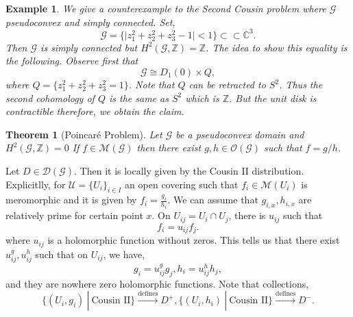 \documentclass{article}
\newtheorem{theorem}{Theorem} [section]
\newtheorem{example}{Example}[section]
\newcommand{\sU}[0]{\mathscr{U}}
\newcommand{\Z}[0]{\mathbb{Z}}
\newcommand{\C}[0]{\mathbb{C}}
\newcommand{\G}[0]{\mathcal{G}}
\newcommand{\sep}[0]{\:|\:}
\newcommand{\Ouv}[0]{\mathcal{O}}
\newcommand{\compembed}[0]{\subset\subset}
\begin{document}
\begin{example}
  We give a counterexample to the Second Cousin problem where $\G$ pseudoconvex and simply connected. Set,
  \begin{equation*}
    \G = \{\vert z_1^2+z_2^2+z_3^2-1\vert<1\}\compembed\C^3.
  \end{equation*}
  Then $\G$ is simply connected but $H^2(\G,\Z)=\Z$. The idea to show this equality is the following. Observe first that 
  \begin{equation*}
    \G\cong D_1(0)\times Q,
  \end{equation*}
  where $Q = \{z_1^2+z_2^2+z_3^2=1\}$. Note that $Q$ can be retracted to $S^2$. Thus the second cohomology of $Q$ is the same as $S^2$ which is $\Z$. But the unit disk is contractible therefore, we obtain the claim.
\end{example}
\begin{theorem}[Poincaré Problem]
  Let $\G$ be a pseudoconvex domain and $H^2(\G,\Z)=0$ If $f\in\mathcal{M}(\G)$ then there exist $g,h\in\Ouv(\G)$ such that $f=g/h$.
\end{theorem}
  Let $D\in\mathcal{D}(\G)$. Then it is locally given by the Cousin II distribution. Explicitlly, for $\sU=\{U_i\}_{i\in I}$ an open covering such that $f_i\in\mathcal{M}(U_i)$ is meromorphic and it is given by $f_i = {\frac {g_i} {h_i}}$. We can assume that 
  $g_{i,x},h_{i,x}$ are relatively prime for certain point $x$. On $U_{ij}=U_i\cap U_j$, there is $u_{ij}$ such that 
  \begin{equation*}
    f_i=u_{ij}f_j.
  \end{equation*}
  where $u_{ij}$ is a holomorphic function without zeros. This tells us that there exist $u^g_{ij},u^h_{ij}$ such that on $U_{ij}$, we have,
  \begin{equation*}
    g_i = u^g_{ij}g_j,h_i = u^h_{ij}h_j,
  \end{equation*}
  and they are nowhere zero holomorphic functions. Note that collections,
  \begin{equation*}
    \{(U_i,g_i)\sep\text{Cousin II}\}\stackrel{\text{defines}}{\to}D^+,\{(U_i,h_i)\sep\text{Cousin II}\}\stackrel{\text{defines}}{\to}D^-.
  \end{equation*}
\end{document}
